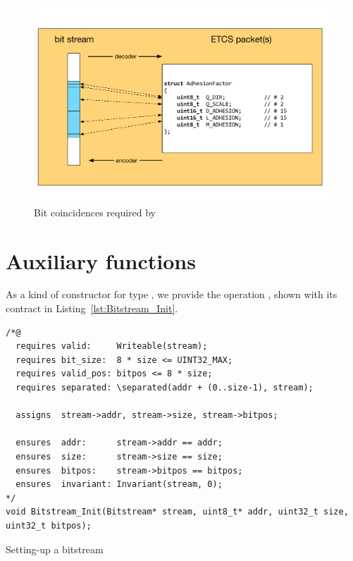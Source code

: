 \begin{figure}
\begin{center}
\includegraphics[width=0.99\textwidth]{figures/equalbits.pdf}
\caption{\label{fig:EqualBits correspondance}
	Bit coincidences required by }
\end{center}
\end{figure}



\section{Auxiliary  functions}
\label{sec:bitstream-aux}


As a kind of constructor for type
, we provide the operation ,
shown with its contract in Listing~\ref{lst:Bitstream_Init}.




\begin{listing}[hbt]
\begin{minipage}{0.99\textwidth}
\begin{lstlisting}[style=acsl-block]
/*@
  requires valid:     Writeable(stream);
  requires bit_size:  8 * size <= UINT32_MAX;
  requires valid_pos: bitpos <= 8 * size;
  requires separated: \separated(addr + (0..size-1), stream);

  assigns  stream->addr, stream->size, stream->bitpos;

  ensures  addr:      stream->addr == addr;
  ensures  size:      stream->size == size;
  ensures  bitpos:    stream->bitpos == bitpos;
  ensures  invariant: Invariant(stream, 0);
*/
void Bitstream_Init(Bitstream* stream, uint8_t* addr, uint32_t size, uint32_t bitpos);
\end{lstlisting}
\end{minipage}
\caption{\label{lst:Bitstream_Init}Setting-up a bitstream}
\end{listing}

